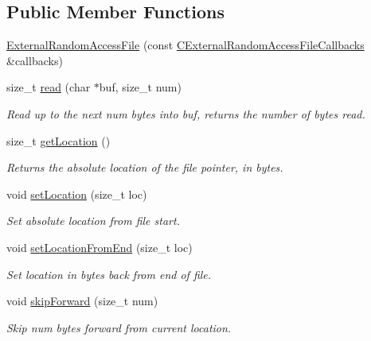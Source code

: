 \subsection*{Public Member Functions}
\begin{DoxyCompactItemize}
\item 
\hyperlink{classBUSBOY_1_1ExternalRandomAccessFile_a5c311bcb0cfb4acbac1736de957af192}{ExternalRandomAccessFile} (const \hyperlink{structCExternalRandomAccessFileCallbacksStruct}{CExternalRandomAccessFileCallbacks} \&callbacks)
\item 
size\_\-t \hyperlink{classBUSBOY_1_1ExternalRandomAccessFile_a7dce7dc11ead8487ffba054210e3adcc}{read} (char $\ast$buf, size\_\-t num)
\begin{DoxyCompactList}\small\item\em Read up to the next num bytes into buf, returns the number of bytes read. \item\end{DoxyCompactList}\item 
size\_\-t \hyperlink{classBUSBOY_1_1ExternalRandomAccessFile_a513ff2125eb4dfb6ebb8456cbb74a386}{getLocation} ()
\begin{DoxyCompactList}\small\item\em Returns the absolute location of the file pointer, in bytes. \item\end{DoxyCompactList}\item 
void \hyperlink{classBUSBOY_1_1ExternalRandomAccessFile_af7feababef4d36ab03b965f18928a6c2}{setLocation} (size\_\-t loc)
\begin{DoxyCompactList}\small\item\em Set absolute location from file start. \item\end{DoxyCompactList}\item 
void \hyperlink{classBUSBOY_1_1ExternalRandomAccessFile_a765ea63c90b6c129f489a92750125afd}{setLocationFromEnd} (size\_\-t loc)
\begin{DoxyCompactList}\small\item\em Set location in bytes back from end of file. \item\end{DoxyCompactList}\item 
void \hyperlink{classBUSBOY_1_1ExternalRandomAccessFile_a58a36479f064e4748302f256bde83519}{skipForward} (size\_\-t num)
\begin{DoxyCompactList}\small\item\em Skip num bytes forward from current location. \item\end{DoxyCompactList}\item 

\end{DoxyCompactItemize}
